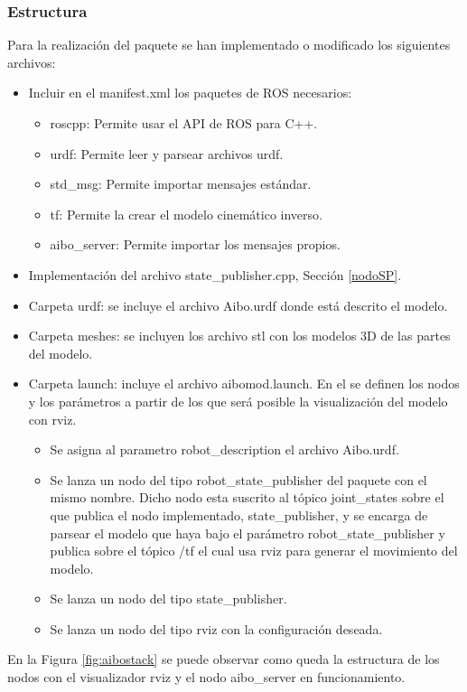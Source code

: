 \documentclass[12pt,a4paper,final,twoside]{book}
\begin{document}
\subsubsection{Estructura}
Para la realización del paquete se han implementado o modificado los siguientes archivos:
\begin{itemize}
\item Incluir en el manifest.xml los paquetes de ROS necesarios:
\begin{itemize}
\item roscpp: Permite usar el API de ROS para C++.
\item urdf: Permite leer y parsear archivos urdf.
\item std{\_}msg: Permite importar mensajes estándar.
\item tf: Permite la crear el modelo cinemático inverso.
\item aibo{\_}server: Permite importar los mensajes propios.  
\end{itemize}
\item Implementación del archivo state{\_}publisher.cpp, Sección \ref{nodoSP}.
\item Carpeta urdf: se incluye el archivo Aibo.urdf donde está descrito el modelo.
\item Carpeta meshes: se incluyen los archivo stl con los modelos 3D de las partes del modelo.
\item Carpeta launch: incluye el archivo aibomod.launch. En el se definen los nodos y los parámetros a partir de los que será posible la visualización del modelo con rviz.
\begin{itemize}
\item Se asigna al parametro robot{\_}description el archivo Aibo.urdf.
\item Se lanza un nodo del tipo robot{\_}state{\_}publisher del paquete con el mismo nombre. Dicho nodo esta suscrito al tópico joint{\_}states sobre el que publica el nodo implementado, state{\_}publisher, y se encarga de parsear el modelo que haya bajo el parámetro robot{\_}state{\_}publisher y publica sobre el tópico /tf el cual usa rviz para generar el movimiento del modelo.
\item Se lanza un nodo del tipo state{\_}publisher.
\item Se lanza un nodo del tipo rviz con la configuración deseada.
\end{itemize}
\end{itemize}

En la Figura \ref{fig:aibostack} se puede observar como queda la estructura de los nodos con el visualizador rviz y el nodo aibo{\_}server en funcionamiento.
\end{document}
